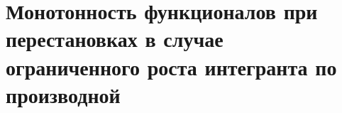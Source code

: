\chapter{Монотонность функционалов при перестановках в случае ограниченного роста интегранта по производной}
\label{chapt1}





